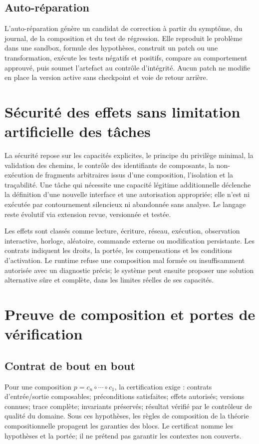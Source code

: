 \documentclass[11pt,a4paper]{article}
\begin{document}
\subsection{Auto-réparation}
L'auto-réparation génère un candidat de correction à partir du symptôme, du journal, de la composition et du test de régression. Elle reproduit le problème dans une sandbox, formule des hypothèses, construit un patch ou une transformation, exécute les tests négatifs et positifs, compare au comportement approuvé, puis soumet l'artefact au contrôle d'intégrité. Aucun patch ne modifie en place la version active sans checkpoint et voie de retour arrière.

\section{Sécurité des effets sans limitation artificielle des tâches}
La sécurité repose sur les capacités explicites, le principe du privilège minimal, la validation des chemins, le contrôle des identifiants de composants, la non-exécution de fragments arbitraires issus d'une composition, l'isolation et la traçabilité. Une tâche qui nécessite une capacité légitime additionnelle déclenche la définition d'une nouvelle interface et une autorisation appropriée; elle n'est ni exécutée par contournement silencieux ni abandonnée sans analyse. Le langage reste évolutif via extension revue, versionnée et testée.

Les effets sont classés comme lecture, écriture, réseau, exécution, observation interactive, horloge, aléatoire, commande externe ou modification persistante. Les contrats indiquent les droits, la portée, les compensations et les conditions d'activation. Le runtime refuse une composition mal formée ou insuffisamment autorisée avec un diagnostic précis; le système peut ensuite proposer une solution alternative sûre et complète, dans les limites réelles de ses capacités.

\section{Preuve de composition et portes de vérification}
\subsection{Contrat de bout en bout}
Pour une composition $p=c_n\circ\cdots\circ c_1$, la certification exige : contrats d'entrée/sortie composables; préconditions satisfaites; effets autorisés; versions connues; trace complète; invariants préservés; résultat vérifié par le contrôleur de qualité du domaine. Sous ces hypothèses, les règles de composition de la théorie compositionnelle propagent les garanties des blocs. Le certificat nomme les hypothèses et la portée; il ne prétend pas garantir les contextes non couverts.
\end{document}
